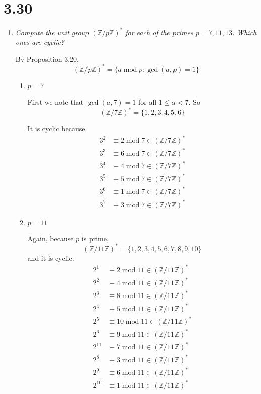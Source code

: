 \documentclass[12pt]{article}
\newcommand{\Z}{\mathbb{Z}}
\renewcommand{\mod}{\; \text{mod}\; }
\begin{document}
\section*{3.30}
    \begin{enumerate}[label=(\alph*)]
        \item \emph{Compute the unit group $(\Z/p\Z)^*$ for each of the primes $p = 7, 11, 13$. Which ones are cyclic?}
        
        \color{blue}
            By Proposition 3.20,
            \[(\Z/p\Z)^* = \{a \mod p: \gcd(a, p) = 1\}\]
            
            \begin{enumerate}
                \item $p = 7$
                
                First we note that $\gcd(a, 7) = 1$ for all $1 \leq a < 7$. So 
                \[(\Z/7\Z)^* = \{1, 2, 3, 4, 5, 6\}\]

                It is cyclic because 
                \begin{align*}
                    3^2 &\equiv 2 \mod 7 \in (\Z/7\Z)^*\\
                    3^3 &\equiv 6 \mod 7 \in (\Z/7\Z)^*\\
                    3^4 &\equiv 4 \mod 7 \in (\Z/7\Z)^*\\
                    3^5 &\equiv 5 \mod 7 \in (\Z/7\Z)^*\\
                    3^6 &\equiv 1 \mod 7 \in (\Z/7\Z)^*\\
                    3^7 &\equiv 3 \mod 7 \in (\Z/7\Z)^*
                \end{align*}

                \item $p = 11$
                
                Again, because $p$ is prime, 
                \[(\Z/11\Z)^* = \{1, 2, 3, 4, 5, 6, 7, 8, 9, 10\}\]
                and it is cyclic:
                \begin{align*}
                    2^1 &\equiv 2 \mod 11 \in (\Z/11\Z)^*\\
                    2^2 &\equiv 4 \mod 11 \in (\Z/11\Z)^*\\
                    2^3 &\equiv 8 \mod 11 \in (\Z/11\Z)^*\\
                    2^4 &\equiv 5 \mod 11 \in (\Z/11\Z)^*\\
                    2^5 &\equiv 10 \mod 11 \in (\Z/11\Z)^*\\
                    2^6 &\equiv 9 \mod 11 \in (\Z/11\Z)^*\\
                    2^11 &\equiv 7 \mod 11 \in (\Z/11\Z)^*\\
                    2^8 &\equiv 3 \mod 11 \in (\Z/11\Z)^*\\
                    2^9 &\equiv 6 \mod 11 \in (\Z/11\Z)^*\\
                    2^{10} &\equiv 1 \mod 11 \in (\Z/11\Z)^*                   
                \end{align*}


\end{enumerate}
\end{enumerate}
\end{document}
